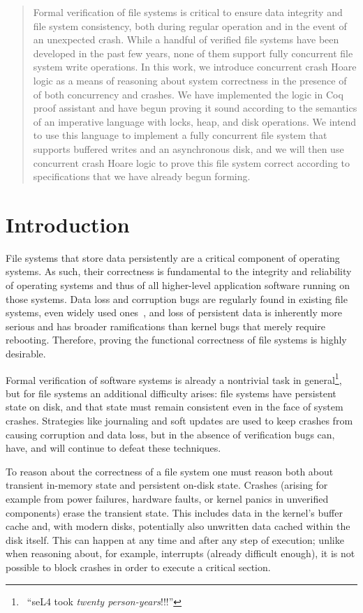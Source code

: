 \begin{abstract}
Formal verification of file systems is critical to ensure data integrity and
file system consistency, both during regular operation and in the event of
an unexpected crash. While a handful of verified file systems have been
developed in the past few years, none of them support fully concurrent file
system write operations. In this work, we introduce concurrent crash Hoare
logic as a means of reasoning about system correctness in the presence of
of both concurrency and crashes. We have implemented the logic in Coq proof
assistant and have begun proving it sound according to the semantics of an
imperative language with locks, heap, and disk operations. We intend to use
this language to implement a fully concurrent file system that supports
buffered writes and an asynchronous disk, and we will then use concurrent
crash Hoare logic to prove this file system correct according to specifications
that we have already begun forming.
\end{abstract}

\section{Introduction}

File systems that store data persistently are a critical component of
operating systems.
As such, their correctness is fundamental to the integrity and
reliability of operating systems and thus of all higher-level
application software running on those systems.
Data loss and corruption bugs are regularly found in existing
file systems, even widely used ones~\cite{yang2006explode},
and loss of persistent data is inherently more serious and has broader
ramifications than kernel bugs that merely require rebooting.
Therefore, proving the functional correctness of file systems is
highly desirable.

Formal verification of software systems is already a
nontrivial task in general\footnote{\
``seL4 took
\textit{twenty person-years}!!!''},
but for file systems an additional difficulty arises:
file systems have persistent state on disk, and
that state must remain consistent even in the face of
system crashes.
Strategies like journaling and soft updates are used to keep crashes
from causing corruption and data loss, but in the absence of
verification bugs can, have, and will continue to defeat these
techniques.

To reason about the correctness of a file system one must reason both
about transient in-memory state and persistent on-disk state.
Crashes (arising for example from power failures, hardware faults, or
kernel panics in unverified components) erase the transient state.
This includes data in the kernel's buffer cache and, with modern
disks, potentially also unwritten data cached within the disk itself.
This can happen at any time and after any step of execution; unlike
when reasoning about, for example,
interrupts (already difficult enough), it is not possible to
block crashes in order to execute a critical section.

